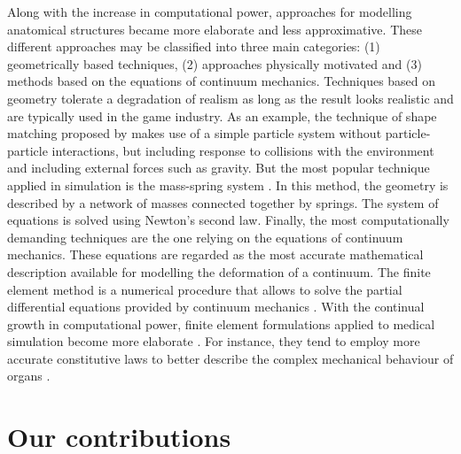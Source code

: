 \bigskip

Along with the increase in computational power, approaches for modelling anatomical structures became more elaborate and less approximative. These different approaches may be classified into three main categories: (1) geometrically based techniques, (2) approaches physically motivated and (3) methods based on the equations of continuum mechanics. Techniques based on geometry tolerate a degradation of realism as long as the result looks realistic and are typically used in the game industry. As an example, the technique of shape matching proposed by \cite{Muller05} makes use of a simple particle system without particle-particle interactions, but including response to collisions with the environment and including external forces such as gravity. But the most popular technique applied in simulation is the mass-spring system \citep{Terzopoulos91,Provot95,Mosegaard05b}. In this method, the geometry is described by a network of masses connected together by springs. The system of equations is solved using Newton's second law. Finally, the most computationally demanding techniques are the one relying on the equations of continuum mechanics. These equations are regarded as the most accurate mathematical description available for modelling the deformation of a continuum. The finite element method is a numerical procedure that allows to solve the partial differential equations provided by continuum mechanics \citep{Cotin99}. With the continual growth in computational power, finite element formulations applied to medical simulation become more elaborate \citep{Sagar94,Felippa00,Debunne01,Miller07}. For instance, they tend to employ more accurate constitutive laws to better describe the complex mechanical behaviour of organs \citep{Fung93}. 


\section{Our contributions}

